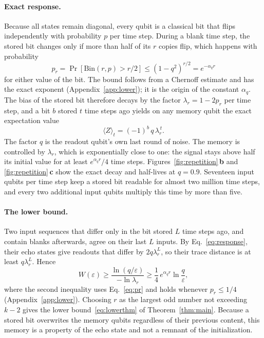\documentclass[aps,pra,reprint,superscriptaddress,floatfix]{revtex4-2}
\theoremstyle{plain}
\newcommand{\pnl}[1]{\textsf{\textbf{#1}}}
\begin{document}
\paragraph*{Exact response.}
Because all states remain diagonal, every qubit is a classical bit that flips independently with probability $p$ per time step. During a blank time step, the stored bit changes only if more than half of its $r$ copies flip, which happens with probability
\begin{equation}
p_r=\Pr[\mathrm{Bin}(r,p)>r/2]\le(1-q^2)^{r/2}=e^{-\alpha_qr}
\label{eq:pr}
\end{equation}
for either value of the bit. The bound follows from a Chernoff estimate and has the exact exponent (Appendix~\ref{app:lower}); it is the origin of the constant $\alpha_q$. The bias of the stored bit therefore decays by the factor $\lambda_r=1-2p_r$ per time step, and a bit $b$ stored $t$ time steps ago yields on any memory qubit the exact expectation value
\begin{equation}
\langle Z\rangle_t=(-1)^b\,q\,\lambda_r^{\,t}.
\label{eq:response}
\end{equation}
The factor $q$ is the readout qubit's own last round of noise. The memory is controlled by $\lambda_r$, which is exponentially close to one: the signal stays above half its initial value for at least $e^{\alpha_qr}/4$ time steps. Figures~\ref{fig:repetition}\,\pnl{b} and \ref{fig:repetition}\,\pnl{c} show the exact decay and half-lives at $q=0.9$. Seventeen input qubits per time step keep a stored bit readable for almost two million time steps, and every two additional input qubits multiply this time by more than five.

\paragraph*{The lower bound.}
Two input sequences that differ only in the bit stored $L$ time steps ago, and contain blanks afterwards, agree on their last $L$ inputs. By Eq.~\eqref{eq:response}, their echo states give readouts that differ by $2q\lambda_r^L$, so their trace distance is at least $q\lambda_r^L$. Hence
\begin{equation}
W(\varepsilon)\ge\frac{\ln(q/\varepsilon)}{-\ln\lambda_r}\ge\frac14\,e^{\alpha_qr}\ln\frac q\varepsilon ,
\label{eq:lower}
\end{equation}
where the second inequality uses Eq.~\eqref{eq:pr} and holds whenever $p_r\le1/4$ (Appendix~\ref{app:lower}). Choosing $r$ as the largest odd number not exceeding $k-2$ gives the lower bound~\eqref{eq:lowerthm} of Theorem~\ref{thm:main}. Because a stored bit overwrites the memory qubits regardless of their previous content, this memory is a property of the echo state and not a remnant of the initialization.
\end{document}
